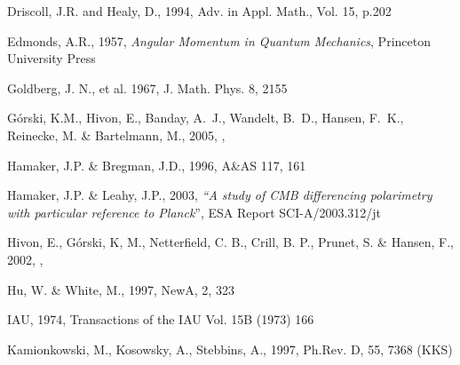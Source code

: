 \documentclass[12pt,twoside]{article}
\begin{document}
\begin{thebibliography}{99}
Driscoll, J.R. and Healy, D., 1994, Adv. in Appl. Math., Vol. 15, p.202
\backrefprint%

Edmonds, A.R., 1957, {\em Angular Momentum in Quantum Mechanics}, Princeton
University Press
\backrefprint%

Goldberg, J. N., et al. 1967, J. Math. Phys. 8, 2155
\backrefprint%

  G\'orski, K.M., Hivon, E., Banday, A.~J., Wandelt,
  B.~D., Hansen, F.~K., Reinecke, M. \& Bartelmann, M., 2005, 
, 
\backrefprint%

Hamaker, J.P. \& Bregman, J.D., 1996, A\&AS 117, 161
\backrefprint%

  Hamaker, J.P. \& Leahy, J.P., 2003, {\em ``A study of CMB differencing
  polarimetry with particular reference to {\em Planck}}'', {\sc ESA Report SCI-A/2003.312/jt}
\backrefprint%

Hivon, E., G{\'o}rski, K, M., Netterfield, C. B., Crill, B. P., Prunet, S. \& Hansen, F., 
2002, , 
\backrefprint%

Hu, W. \& White, M., 1997, NewA, 2, 323
\backrefprint%

IAU, 1974, Transactions of the IAU Vol. 15B (1973) 166
\backrefprint%

Kamionkowski, M., Kosowsky, A., Stebbins, A., 1997, Ph.Rev. D, 55, 7368 (KKS)
\backrefprint%


\end{thebibliography}
\end{document}
